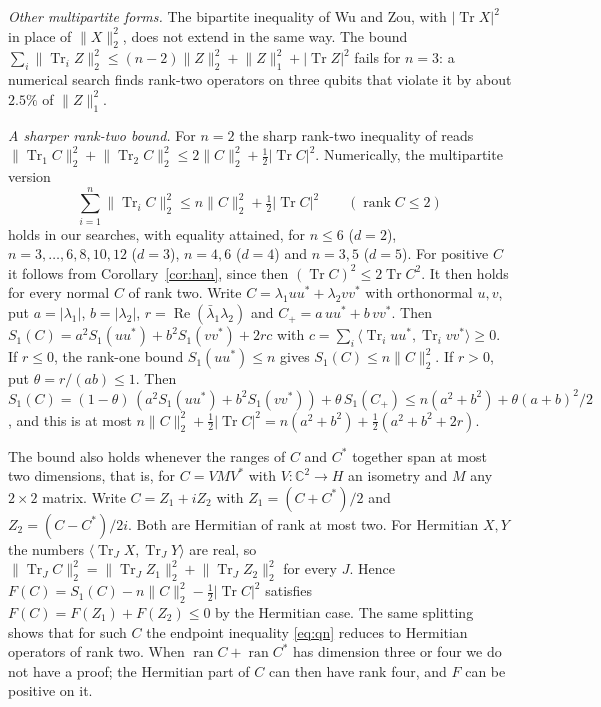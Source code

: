 \documentclass[11pt]{article}
\theoremstyle{remark}
\newcommand{\Tr}{\operatorname{Tr}}
\renewcommand{\Re}{\operatorname{Re}}
\newcommand{\norm}[1]{\lVert #1\rVert}
\begin{document}
\emph{Other multipartite forms.} The bipartite inequality of Wu and Zou, with $|\Tr X|^2$ in place of $\norm{X}_2^2$,
does not extend in the same way. The bound
$\sum_i\norm{\Tr_iZ}_2^2\le(n-2)\norm{Z}_2^2+\norm{Z}_1^2+|\Tr Z|^2$ fails for $n=3$: a numerical search finds rank-two operators
on three qubits that violate it by about $2.5\%$ of $\norm{Z}_1^2$.

\emph{A sharper rank-two bound.} For $n=2$ the sharp rank-two inequality of \cite{FHPV,BGH} reads
$\norm{\Tr_1C}_2^2+\norm{\Tr_2C}_2^2\le2\norm{C}_2^2+\tfrac12|\Tr C|^2$. Numerically, the multipartite version
\[
\sum_{i=1}^n\norm{\Tr_iC}_2^2\le n\norm{C}_2^2+\tfrac12|\Tr C|^2\qquad(\operatorname{rank}C\le2)
\]
holds in our searches, with equality attained, for $n\le6$ ($d=2$), $n=3,\dots,6,8,10,12$ ($d=3$), $n=4,6$ ($d=4$) and
$n=3,5$ ($d=5$). For positive $C$ it
follows from Corollary~\ref{cor:han}, since then
$(\Tr C)^2\le2\Tr C^2$. It then holds for every normal $C$ of rank two. Write $C=\lambda_1uu^*+\lambda_2vv^*$ with
orthonormal $u,v$, put $a=|\lambda_1|$, $b=|\lambda_2|$, $r=\Re(\bar\lambda_1\lambda_2)$ and $C_+=a\,uu^*+b\,vv^*$.
Then $S_1(C)=a^2S_1(uu^*)+b^2S_1(vv^*)+2rc$ with $c=\sum_i\langle\Tr_iuu^*,\Tr_ivv^*\rangle\ge0$. If $r\le0$, the
rank-one bound $S_1(uu^*)\le n$ gives $S_1(C)\le n\norm{C}_2^2$. If $r>0$, put $\theta=r/(ab)\le1$. Then
$S_1(C)=(1-\theta)\,(a^2S_1(uu^*)+b^2S_1(vv^*))+\theta\,S_1(C_+)\le n(a^2+b^2)+\theta(a+b)^2/2$, and this is at most
$n\norm{C}_2^2+\tfrac12|\Tr C|^2=n(a^2+b^2)+\tfrac12(a^2+b^2+2r)$.

The bound also holds whenever the ranges of $C$ and $C^*$ together span at most two dimensions, that is, for
$C=VMV^*$ with $V:\mathbb C^2\to H$ an isometry and $M$ any $2\times2$ matrix. Write $C=Z_1+iZ_2$ with $Z_1=(C+C^*)/2$ and $Z_2=(C-C^*)/2i$. Both are
Hermitian of rank at most two. For Hermitian $X,Y$ the numbers $\langle\Tr_JX,\Tr_JY\rangle$ are real, so
$\norm{\Tr_JC}_2^2=\norm{\Tr_JZ_1}_2^2+\norm{\Tr_JZ_2}_2^2$ for every $J$. Hence
$F(C)=S_1(C)-n\norm{C}_2^2-\tfrac12|\Tr C|^2$ satisfies $F(C)=F(Z_1)+F(Z_2)\le0$ by the Hermitian case. The same
splitting shows that for such $C$ the endpoint inequality \eqref{eq:qn} reduces to Hermitian operators of rank two.
When $\operatorname{ran}C+\operatorname{ran}C^*$ has dimension three or four we do not have a proof; the Hermitian part
of $C$ can then have rank four, and $F$ can be positive on it.
\end{document}
